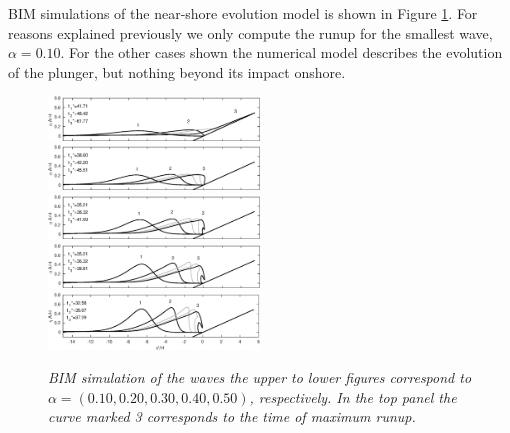 \documentclass[review, authoryear]{elsarticle}
\begin{document}
BIM simulations of the near-shore evolution model is shown in Figure \ref{fig:BIM}.
For reasons explained previously we only compute the runup for the 
smallest wave, $\alpha=0.10$.  For the other cases shown the numerical
model describes the evolution of the plunger, but nothing beyond its impact onshore.  
\begin{figure}[]
\centering 
\includegraphics[width=0.5\textwidth]{./Figures/BIM/case10_BIM_runup_r.eps}
\includegraphics[width=0.5\textwidth]{./Figures/BIM/case20_BIM_runup_r.eps}
\includegraphics[width=0.5\textwidth]{./Figures/BIM/case30_BIM_runup_r.eps}
\includegraphics[width=0.5\textwidth]{./Figures/BIM/case40_BIM_runup_r.eps}
\includegraphics[width=0.5\textwidth]{./Figures/BIM/case50_BIM_runup_r.eps}
\caption{\textit{BIM simulation of the waves the upper to lower figures correspond to $\alpha=(0.10, 0.20, 0.30, 0.40, 0.50)$, respectively. In the top panel the curve marked 3 corresponds to the time of maximum runup.}}
\label{fig:BIM}
\end{figure}
\end{document}
